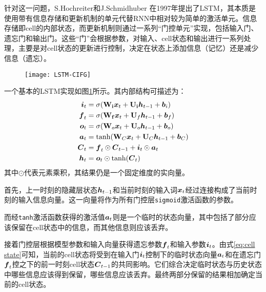 针对这一问题，S.Hochreiter和J.Schmidhuber\citep{hochreiter1997long} 在1997年提出了LSTM，其本质是使用带有信息存储和更新机制的单元代替RNN中相对较为简单的激活单元。信息存储即cell的内部状态，而更新机制则通过一系列“门控单元”实现，包括输入门、遗忘门和输出门。这些“门”会根据参数，对输入、cell状态和输出进行一系列处理，主要是对cell状态的更新进行控制，决定在状态上添加信息（记忆）还是减少信息（遗忘）。
\begin{figure}[H]
    \centering
    \texttt{[image: LSTM-CIFG]}
    \label{fig:LSTM}
\end{figure}


一个基本的LSTM实现如图\ref{fig:LSTM}所示。其内部结构可描述为：
\begin{align}
\boldsymbol{i}_t &= \sigma(\boldsymbol{\mathbf{W_i}}\boldsymbol{x}_t + \boldsymbol{\mathbf{U_i}}\boldsymbol{h}_{t-1} + \boldsymbol{b}_i)
    \label{eq:lstm_i}\\
\boldsymbol{f}_t &= \sigma(\boldsymbol{\mathbf{W_f}}\boldsymbol{x}_t + \boldsymbol{\mathbf{U}}_f\boldsymbol{h}_{t-1} + \boldsymbol{b}_f)\\
    \boldsymbol{o}_t &= \sigma(\boldsymbol{\mathbf{W}}_o\boldsymbol{x}_t + \boldsymbol{\mathbf{U}}_o\boldsymbol{h}_{t-1} + \boldsymbol{b}_o)\\
    \boldsymbol{a}_t &= \tanh(\boldsymbol{\mathbf{W}}_C\boldsymbol{x}_t + \boldsymbol{\mathbf{U}}_C\boldsymbol{h}_{t-1} + \boldsymbol{b}_C)\\
    \boldsymbol{C}_t &= \boldsymbol{f}_t\odot\boldsymbol{C}_{t-1} +
                    \boldsymbol{i}_t\odot\boldsymbol{a}_t
                    \label{eq:cell state}\\
    \boldsymbol{h}_t &= \boldsymbol{o}_t \odot \tanh(\boldsymbol{C}_t)\label{eq:lstm_C}
\end{align}
其中$\odot$代表元素乘积，其结果仍是一个固定维度的实向量。

首先，上一时刻的隐藏层状态$\boldsymbol{h}_{t-1}$和当前时刻的输入词$\boldsymbol{x}_t$经过连接构成了当前时刻的输入信息向量。这一向量将作为所有门控层\verb|sigmoid|激活函数的参数。

而经\verb|tanh|激活函数获得的激活值$\boldsymbol{a}_t$则是一个临时的状态向量，其中包括了部分应该保留在cell状态中的信息，而其他信息则应该丢弃。

接着门控层根据模型参数和输入向量获得遗忘参数$\boldsymbol{f}_t$和输入参数$\boldsymbol{i}_t$。由式\ref{eq:cell state}可知，当前的cell状态将受到在输入门$\boldsymbol{i}_t$控制下的临时状态向量$\boldsymbol{a}_t$和在遗忘门$\boldsymbol{f}_t$控之下的前一时刻cell状态$\boldsymbol{C}_{t-1}$的共同影响。它们综合决定临时状态与历史状态中哪些信息应该得到保留，哪些信息应该丢弃。最终两部分保留的结果相加确定当前的cell状态。

